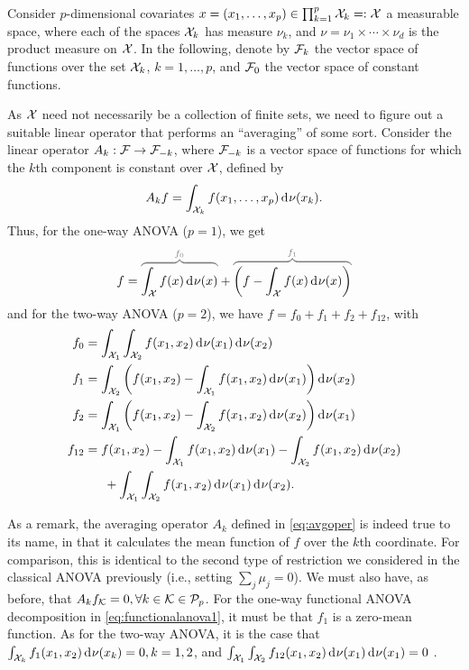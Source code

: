 
Consider $p$-dimensional covariates $x=(x_1,\dots,x_p) \in \prod_{k=1}^p {\mathcal X}_k =: {\mathcal X}$ a measurable space, where each of the spaces ${\mathcal X}_k$ has measure $\nu_k$, and $\nu=\nu_1\times\cdots\times\nu_d$ is the product measure on ${\mathcal X}$.
In the following, denote by ${\mathcal F}_k$ the vector space of functions over the set ${\mathcal X}_k$, $k=1,\dots,p$, and ${\mathcal F}_0$ the vector space of constant functions.

As ${\mathcal X}$ need not necessarily be a collection of finite sets, we need to figure out a suitable linear operator that performs an ``averaging'' of some sort.
Consider the linear operator $A_k:{\mathcal F}\to {\mathcal F}_{-k}$, where ${\mathcal F}_{-k}$ is a vector space of functions for which the $k$th component is constant over ${\mathcal X}$, defined by
\begin{align}\label{eq:avgoper}
  A_k f = \int_{{\mathcal X}_k} f(x_1,\dots,x_p) \operatorname{d}\hspace{0.5pt}\! \nu(x_k).
\end{align}
Thus, for the one-way ANOVA ($p=1$), we get
\begin{align}\label{eq:functionalanova1}
  f = 
  \greyoverbrace{\int_\cX f(x)\dint\nu(x)}{f_0} 
  + 
  \greyoverbrace{\left( f - \int_\cX f(x)\dint\nu(x) \right)}{f_1}
\end{align}
and for the two-way ANOVA ($p=2$), we have $f = f_0 + f_1 + f_2 + f_{12}$, with
\begin{align*}
  f_0 &= \int_{\cX_1}\int_{\cX_2} f(x_1,x_2) \dint\nu(x_1)\dint\nu(x_2) \\
  f_1 &= \int_{\cX_2} \left( f(x_1,x_2) - \int_{\cX_1} f(x_1,x_2) \dint\nu(x_1) \right) \dint\nu(x_2)\\  
  f_2 &= \int_{\cX_1} \left( f(x_1,x_2) - \int_{\cX_2} f(x_1,x_2) \dint\nu(x_2) \right) \dint\nu(x_1)\\  
  f_{12} &= f(x_1,x_2) - \int_{\cX_1} f(x_1,x_2) \dint\nu(x_1) - \int_{\cX_2} f(x_1,x_2) \dint\nu(x_2) \\
  &\phantom{==} + \int_{\cX_1}\int_{\cX_2} f(x_1,x_2) \dint\nu(x_1) \dint\nu(x_2).
\end{align*}

As a remark, the averaging operator $A_k$ defined in \cref{eq:avgoper} is indeed true to its name, in that it calculates the mean function of $f$ over the $k$th coordinate. 
For comparison, this is identical to the second type of restriction we considered in the classical ANOVA previously (i.e., setting $\sum_j \mu_j = 0$).
We must also have, as before, that $A_kf_{\mathcal K} = 0, \forall k \in {\mathcal K} \in {\mathcal P}_p$.
For the one-way functional ANOVA decomposition in \cref{eq:functionalanova1}, it must be that $f_1$ is a zero-mean function.
As for the two-way ANOVA, it is the case that $\int_{{\mathcal X}_k} f_1(x_1,x_2) \operatorname{d}\hspace{0.5pt}\!\nu(x_k) = 0, k=1,2$, and $\int_{{\mathcal X}_1}\int_{{\mathcal X}_2} f_{12}(x_1,x_2) \operatorname{d}\hspace{0.5pt}\!\nu(x_1)\operatorname{d}\hspace{0.5pt}\!\nu(x_1) = 0$ \citep{durrande2013anova}.

